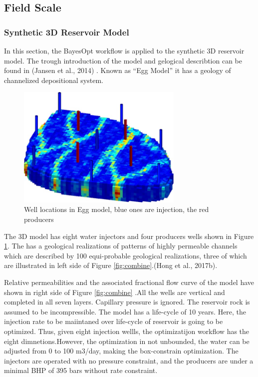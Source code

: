 \documentclass[]{elsarticle} %
\begin{document}
\newpage

\hypertarget{field-scale}{%
\subsection{Field Scale}\label{field-scale}}

\hypertarget{synthetic-3d-reservoir-model}{%
\subsubsection{Synthetic 3D Reservoir Model}\label{synthetic-3d-reservoir-model}}

In this section, the BayesOpt workflow is applied to the synthetic 3D reservoir model. The trough introduction of the model and gelogical describtion can be found in (Jansen et al., 2014) . Known as ``Egg Model'' it has a geology of channelized depositional system.

\begin{figure}

{\centering \includegraphics[width=300px]{img/egg_base} 

}

\caption{Well locations in Egg model, blue ones are injection, the red producers}\label{fig:eggbase}
\end{figure}

The 3D model has eight water injectors and four producers wells shown in Figure \ref{fig:eggbase}. The has a geological realizations of patterns of highly permeable channels which are described by 100 equi-probable geological realizations, three of which are illustrated in left side of Figure \ref{fig:combine}.(Hong et al., 2017b).

Relative permeabilities and the associated fractional flow curve of the model have shown in right side of Figure \ref{fig:combine} .All the wells are vertical and completed in all seven layers. Capillary pressure is ignored. The reservoir rock is assumed to be incompressible. The model has a life-cycle of 10 years. Here, the injection rate to be maiintaned over life-cycle of reservoir is going to be optimized. Thus, given eight injection wellls, the optimizatijon workflow has the eight dimnetions.However, the optimization in not unbounded, the water can be adjusted from 0 to 100 m3/day, making the box-constrain optimization. The injectors are operated with no pressure constraint, and the producers are under a minimal BHP of 395 bars without rate constraint.
\end{document}
